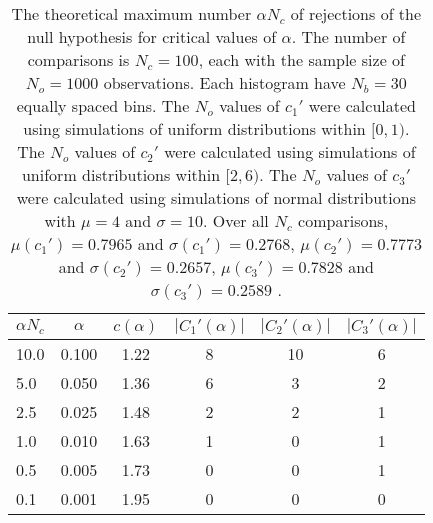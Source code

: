 \begin{table}[!h]
\begin{center}
\begin{tabular}{| l | c | c | c | c | c |}\hline
$\alpha N_c$ & $\alpha$ & $c(\alpha)$ & $|C_1'(\alpha)|$ & $|C_2'(\alpha)|$ & $|C_3'(\alpha)|$ \\\hline
10.0 & 0.100 & 1.22 & 8 & 10 & 6 \\\hline
5.0 & 0.050 & 1.36 & 6 & 3 & 2 \\\hline
2.5 & 0.025 & 1.48 & 2 & 2 & 1 \\\hline
1.0 & 0.010 & 1.63 & 1 & 0 & 1 \\\hline
0.5 & 0.005 & 1.73 & 0 & 0 & 1 \\\hline
0.1 & 0.001 & 1.95 & 0 & 0 & 0 \\\hline
\end{tabular}
\caption{The theoretical maximum number $\alpha N_c$ of rejections
of the null hypothesis for critical values of $\alpha$.
The number of comparisons is $N_c=100$,
each with the sample size of $N_o=1000$ observations.
Each histogram have $N_b=30$ equally spaced bins.
The $N_o$ values of $c_1'$ were calculated using simulations of
 uniform distributions within $[0,1)$.
The $N_o$ values of $c_2'$ were calculated using simulations of
 uniform distributions within $[2,6)$.
The $N_o$ values of $c_3'$ were calculated using simulations of
 normal distributions with $\mu=4$ and $\sigma=10$.
Over all $N_c$ comparisons,
 $\mu(c_1')=0.7965$ and $\sigma(c_1')=0.2768$,
 $\mu(c_2')=0.7773$ and $\sigma(c_2')=0.2657$,
 $\mu(c_3')=0.7828$ and $\sigma(c_3')=0.2589$ .
}
\end{center}
\end{table}
